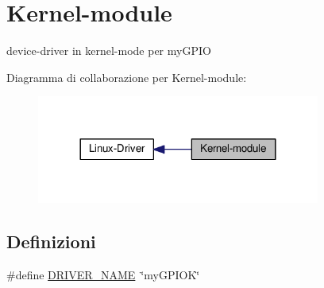 \hypertarget{group___kernel-module}{\section{Kernel-\/module}
\label{group___kernel-module}
}


device-\/driver in kernel-\/mode per my\+G\+P\+I\+O  


Diagramma di collaborazione per Kernel-\/module\+:\nopagebreak
\begin{figure}[H]
\begin{center}
\leavevmode
\includegraphics[width=264pt]{group___kernel-module}
\end{center}
\end{figure}
\subsection*{Definizioni}
\begin{DoxyCompactItemize}
\item 
\#define \hyperlink{group___kernel-module_ga25634d21648ca7fb7a2aca614bafaaeb}{D\+R\+I\+V\+E\+R\+\_\+\+N\+A\+M\+E}~\char`\"{}my\+G\+P\+I\+O\+K\char`\"{}
\end{DoxyCompactItemize}
